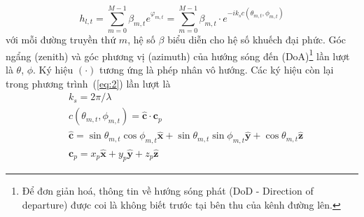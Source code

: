\begin{equation}
\label{eq:2}
        h_{l, t} = \sum\limits_{m=0}^{M-1} \beta_{m, t} e^{\varphi_{m, t}} = \sum\limits_{m=0}^{M-1} \beta_{m, t} \cdot e^{-i k_s c(\theta_{m, t}, \phi_{m, t})} 
\end{equation}
với mỗi đường truyền thứ $m$, hệ số $\beta$ biểu diễn cho hệ số khuếch đại phức. Góc ngẩng (zenith) và góc phương vị (azimuth) của hướng sóng đến (DoA)\footnote{Để đơn giản hoá, thông tin về hướng sóng phát (DoD - Direction of departure) được coi là không biết trước tại bên thu của kênh đường lên.} lần lượt là  $\theta$, $\phi$. Ký hiệu $(\cdot)$ tương ứng là phép nhân vô hướng.
Các ký hiệu còn lại trong phương trình~(\ref{eq:2}) lần lượt là
\begin{equation}
    \begin{aligned}
        &k_s = 2\pi/\lambda \\
        &c(\theta_{m, t}, \phi_{m, t}) = \widehat{\boldsymbol{c}} \cdot \boldsymbol{c}_p \\
        &\widehat{\boldsymbol{c}}=\sin \theta_{m, t} \cos \phi_{m, t} \widehat{\boldsymbol{x}}+\sin \theta_{m, t} \sin \phi_{m, t} \widehat{\boldsymbol{y}}+\cos \theta_{m, t} \widehat{\boldsymbol{z}} \\
        &\boldsymbol{c}_p=x_{p} \widehat{\boldsymbol{x}}+y_{p} \widehat{\boldsymbol{y}}+z_{p} \hat{\boldsymbol{z}}
    \end{aligned}
\end{equation}
